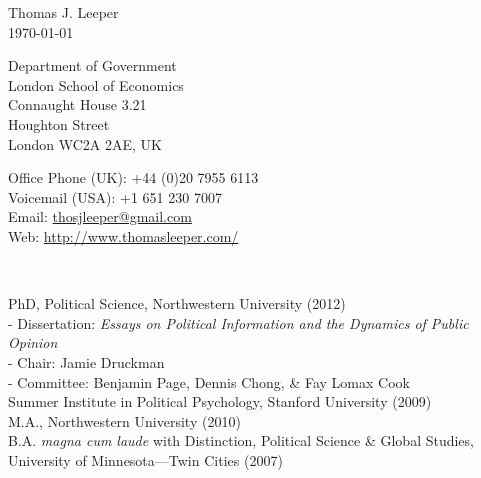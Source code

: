 \documentclass[12pt]{article}
\renewcommand{\section}[1]{\pagebreak[3]%
    \llap{\scshape\smash{\parbox[t]{\marginparwidth}{\raggedright {\color{lg}#1}}}}%
    \vspace{-\baselineskip}\par}
\newcommand{\entry}[1]{\indent {\color{lg}\guillemotright}\hspace{2pt}#1\vspace{.25em}\\}
\newcommand{\subentry}[1]{{\color{lg}-} #1\vspace{.25em}\\}
\begin{document}
{\LARGE Thomas J. Leeper}\\

\today\\

\begin{minipage}[b]{0.5\linewidth}
Department of Government\\
London School of Economics\\
Connaught House 3.21\\
Houghton Street\\
London WC2A 2AE, UK
\end{minipage}
\begin{minipage}[b]{0.5\linewidth}
Office Phone (UK): +44 (0)20 7955 6113\\
Voicemail (USA): +1 651 230 7007\\
Email: \href{mailto:thosjleeper@gmail.com}{thosjleeper@gmail.com}\\
Web: \href{http://www.thomasleeper.com/}{http://www.thomasleeper.com/}\\
\end{minipage}\\

\section{Education}
\entry{PhD, Political Science, Northwestern University (2012)}
\subentry{Dissertation: {\em Essays on Political Information and the Dynamics of Public Opinion}}
\subentry{Chair: Jamie Druckman}
\subentry{Committee: Benjamin Page, Dennis Chong, \& Fay Lomax Cook}
\entry{Summer Institute in Political Psychology, Stanford University (2009)}
\entry{M.A., Northwestern University (2010)}
\entry{B.A. {\em magna cum laude} with Distinction, Political Science \& Global Studies, University of Minnesota---Twin Cities (2007)}
\end{document}
